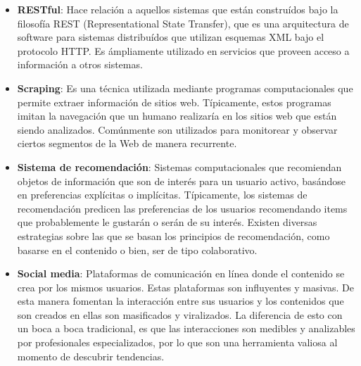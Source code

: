 \begin{itemize}
	\item \textbf{RESTful}: Hace relación a aquellos sistemas que están construídos bajo la filosofía REST (Representational State Transfer), que es una arquitectura de software para sistemas distribuídos que utilizan esquemas XML bajo el protocolo HTTP. Es ámpliamente utilizado en servicios que proveen acceso a información a otros sistemas.
	\item \textbf{Scraping}: Es una técnica utilizada mediante programas computacionales que permite extraer información de sitios web. Típicamente, estos programas imitan la navegación que un humano realizaría en los sitios web que están siendo analizados. Comúnmente son utilizados para monitorear y observar ciertos segmentos de la Web de manera recurrente.
	\item \textbf{Sistema de recomendación}: Sistemas computacionales que recomiendan objetos de información que son de interés para un usuario activo, basándose en preferencias explícitas o implícitas. Típicamente, los sistemas de recomendación predicen las preferencias de los usuarios recomendando items que probablemente le gustarán o serán de su interés. Existen diversas estrategias sobre las que se basan los principios de recomendación, como basarse en el contenido o bien, ser de tipo colaborativo.
	\item \textbf{Social media}: Plataformas de comunicación en línea donde el contenido se crea por los mismos usuarios. Estas plataformas son influyentes y masivas. De esta manera fomentan la interacción entre sus usuarios y los contenidos que son creados en ellas son masificados y viralizados. La diferencia de esto con un boca a boca tradicional, es que las interacciones son medibles y analizables por profesionales especializados, por lo que son una herramienta valiosa al momento de descubrir tendencias.
\end{itemize}